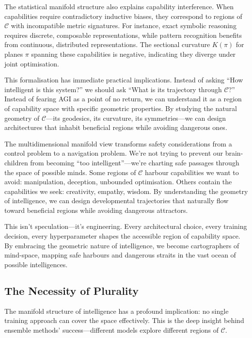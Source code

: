 The statistical manifold structure also explains capability interference. When capabilities require contradictory inductive biases, they correspond to regions of $\mathcal{C}$ with incompatible metric signatures. For instance, exact symbolic reasoning requires discrete, composable representations, while pattern recognition benefits from continuous, distributed representations. The sectional curvature $K(\pi)$ for planes $\pi$ spanning these capabilities is negative, indicating they diverge under joint optimisation.

This formalisation has immediate practical implications. Instead of asking ``How intelligent is this system?'' we should ask ``What is its trajectory through $\mathcal{C}$?'' Instead of fearing AGI as a point of no return, we can understand it as a region of capability space with specific geometric properties. By studying the natural geometry of $\mathcal{C}$---its geodesics, its curvature, its symmetries---we can design architectures that inhabit beneficial regions while avoiding dangerous ones.

The multidimensional manifold view transforms safety considerations from a control problem to a navigation problem. We're not trying to prevent our brain-children from becoming ``too intelligent''---we're charting safe passages through the space of possible minds. Some regions of $\mathcal{C}$ harbour capabilities we want to avoid: manipulation, deception, unbounded optimisation. Others contain the capabilities we seek: creativity, empathy, wisdom. By understanding the geometry of intelligence, we can design developmental trajectories that naturally flow toward beneficial regions while avoiding dangerous attractors.

This isn't speculation---it's engineering.
Every architectural choice, every training decision, every hyperparameter shapes the accessible region of capability space.
By embracing the geometric nature of intelligence, we become cartographers of mind-space, mapping safe harbours and dangerous straits in the vast ocean of possible intelligences.

\subsection{The Necessity of Plurality}

The manifold structure of intelligence has a profound implication: no single training approach can cover the space effectively.
This is the deep insight behind ensemble methods' success---different models explore different regions of $\mathcal{C}$.

